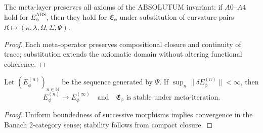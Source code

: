 
\begin{corollary}\label{cor:meta-consistency}
The meta-layer preserves all axioms of the ABSOLUTUM invariant:
if $A0$–$A4$ hold for $E_\phi^{\mathrm{ABS}}$, then they hold for $\mathfrak E_\phi$ under substitution of curvature pairs 
$\mathfrak K\mapsto(\kappa,\lambda,\Omega,\Sigma,\Psi)$.
\end{corollary}

\begin{proof}
Each meta-operator preserves compositional closure and continuity of trace; substitution extends the axiomatic domain without altering functional coherence. \relax
\end{proof}


\begin{theorem}\label{thm:meta-convergence}
Let $(E_\phi^{(n)})_{n\in\mathbb N}$ be the sequence generated by $\Psi$.
If $\sup_n\|\delta E_\phi^{(n)}\|<\infty$, then 
\[
E_\phi^{(n)}\to E_\phi^{(\infty)}
\quad\text{and}\quad
\mathfrak E_\phi\text{ is stable under meta-iteration.}
\]
\end{theorem}

\begin{proof}
Uniform boundedness of successive morphisms implies convergence in the Banach 2-category sense; stability follows from compact closure. \relax
\end{proof}

